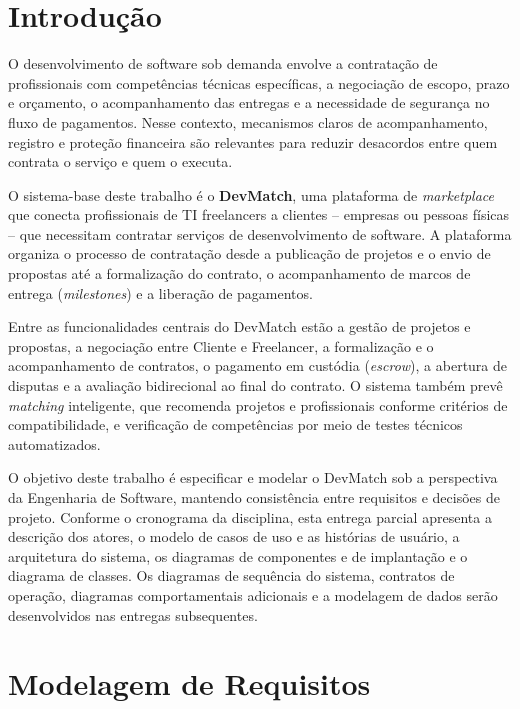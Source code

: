\section{Introdução}
\label{sec:intro}

O desenvolvimento de software sob demanda envolve a contratação de profissionais com competências técnicas específicas, a negociação de escopo, prazo e orçamento, o acompanhamento das entregas e a necessidade de segurança no fluxo de pagamentos. Nesse contexto, mecanismos claros de acompanhamento, registro e proteção financeira são relevantes para reduzir desacordos entre quem contrata o serviço e quem o executa.

O sistema-base deste trabalho é o \textbf{DevMatch}, uma plataforma de \textit{marketplace} que conecta profissionais de TI freelancers a clientes -- empresas ou pessoas físicas -- que necessitam contratar serviços de desenvolvimento de software. A plataforma organiza o processo de contratação desde a publicação de projetos e o envio de propostas até a formalização do contrato, o acompanhamento de marcos de entrega (\textit{milestones}) e a liberação de pagamentos.

Entre as funcionalidades centrais do DevMatch estão a gestão de projetos e propostas, a negociação entre Cliente e Freelancer, a formalização e o acompanhamento de contratos, o pagamento em custódia (\textit{escrow}), a abertura de disputas e a avaliação bidirecional ao final do contrato. O sistema também prevê \textit{matching} inteligente, que recomenda projetos e profissionais conforme critérios de compatibilidade, e verificação de competências por meio de testes técnicos automatizados.

O objetivo deste trabalho é especificar e modelar o DevMatch sob a perspectiva da Engenharia de Software, mantendo consistência entre requisitos e decisões de projeto. Conforme o cronograma da disciplina, esta entrega parcial apresenta a descrição dos atores, o modelo de casos de uso e as histórias de usuário, a arquitetura do sistema, os diagramas de componentes e de implantação e o diagrama de classes. Os diagramas de sequência do sistema, contratos de operação, diagramas comportamentais adicionais e a modelagem de dados serão desenvolvidos nas entregas subsequentes.

\section{Modelagem de Requisitos}
\label{sec:requisitos}

